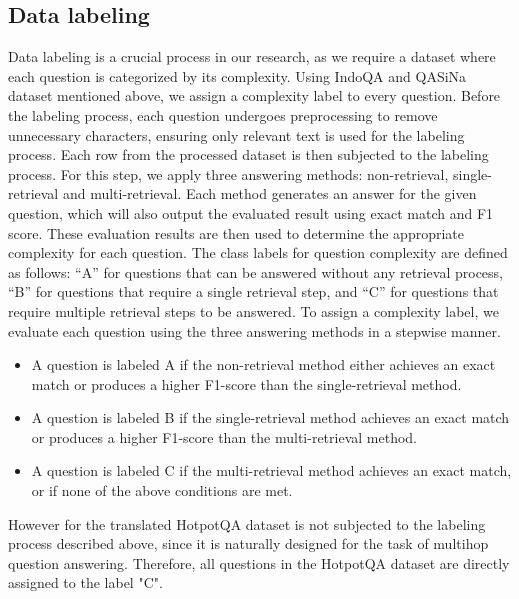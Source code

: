 \documentclass[times]{iapress}
\begin{document}
\subsection{Data labeling}
Data labeling is a crucial process in our research, as we require a dataset where each question is categorized by its complexity. Using IndoQA and QASiNa dataset mentioned above, we assign a complexity label to every question. Before the labeling process, each question undergoes preprocessing to remove unnecessary characters, ensuring only relevant text is used for the labeling process. Each row from the processed dataset is then subjected to the labeling process. For this step, we apply three answering methods: non-retrieval, single-retrieval and multi-retrieval. Each method generates an answer for the given question, which will also output the evaluated result using exact match and F1 score. These evaluation results are then used to determine the appropriate complexity for each question. The class labels for question complexity are defined as follows: “A” for questions that can be answered without any retrieval process, “B” for questions that require a single retrieval step, and “C” for questions that require multiple retrieval steps to be answered. 
To assign a complexity label, we evaluate each question using the three answering methods in a stepwise manner.
\begin{itemize}
    \item A question is labeled A if the non-retrieval method either achieves an exact match or produces a higher F1-score than the single-retrieval method.
    \item A question is labeled B if the single-retrieval method achieves an exact match or produces a higher F1-score than the multi-retrieval method.
    \item A question is labeled C if the multi-retrieval method achieves an exact match, or if none of the above conditions are met.
\end{itemize}

However for the translated HotpotQA dataset is not subjected to the labeling process described above, since it is naturally designed for the task of multihop question answering. Therefore, all questions in the HotpotQA dataset are directly assigned to the label "C".
\end{document}

